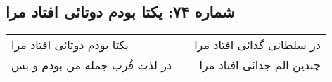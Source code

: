\begin{center}
\section*{شماره ۷۴: یکتا بودم دوتائی افتاد مرا}
\label{sec:074}
\begin{longtable}{l p{0.5cm} r}
یکتا بودم دوتائی افتاد مرا
&&
در سلطانی گدائی افتاد مرا
\\
در لذت قُرب جمله من بودم و بس
&&
چندین الم جدائی افتاد مرا
\\
\end{longtable}
\end{center}
